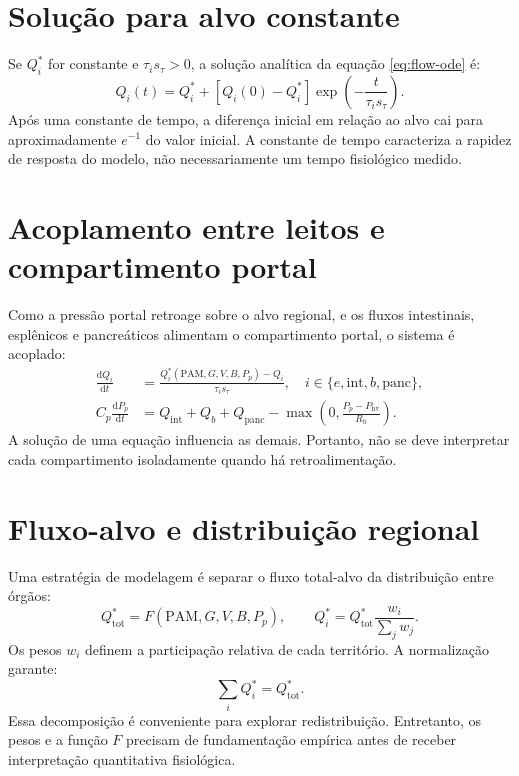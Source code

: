 \documentclass[11pt,a4paper,oneside]{book}
\newcommand{\diff}[2]{\frac{\mathrm{d}#1}{\mathrm{d}#2}}
\newcommand{\MAP}{\mathrm{PAM}}
\begin{document}
\section{Solução para alvo constante}
Se $Q_i^*$ for constante e $\tau_i s_\tau>0$, a solução analítica da equação \eqref{eq:flow-ode} é:
\begin{equation}
  Q_i(t)=Q_i^*+[Q_i(0)-Q_i^*]
  \exp\left(-\frac{t}{\tau_i s_\tau}\right).
  \label{eq:exponential}
\end{equation}
Após uma constante de tempo, a diferença inicial em relação ao alvo cai para aproximadamente $e^{-1}$ do valor inicial. A constante de tempo caracteriza a rapidez de resposta do modelo, não necessariamente um tempo fisiológico medido.

\section{Acoplamento entre leitos e compartimento portal}
Como a pressão portal retroage sobre o alvo regional, e os fluxos intestinais, esplênicos e pancreáticos alimentam o compartimento portal, o sistema é acoplado:
\begin{align}
  \diff{Q_i}{t}&=\frac{Q_i^*(\MAP,G,V,B,P_p)-Q_i}{\tau_i s_\tau},
  \quad i\in\{e,\mathrm{int},b,\mathrm{panc}\},\\
  C_p\diff{P_p}{t}&=Q_{\mathrm{int}}+Q_b+Q_{\mathrm{panc}}
  -\max\left(0,\frac{P_p-P_{\mathrm{hv}}}{R_h}\right).
\end{align}
A solução de uma equação influencia as demais. Portanto, não se deve interpretar cada compartimento isoladamente quando há retroalimentação.

\section{Fluxo-alvo e distribuição regional}
Uma estratégia de modelagem é separar o fluxo total-alvo da distribuição entre órgãos:
\begin{equation}
  Q_{\mathrm{tot}}^*=F(\MAP,G,V,B,P_p),
  \qquad
  Q_i^*=Q_{\mathrm{tot}}^*\frac{w_i}{\sum_j w_j}.
  \label{eq:target}
\end{equation}
Os pesos $w_i$ definem a participação relativa de cada território. A normalização garante:
\begin{equation}
  \sum_i Q_i^*=Q_{\mathrm{tot}}^*.
\end{equation}
Essa decomposição é conveniente para explorar redistribuição. Entretanto, os pesos e a função $F$ precisam de fundamentação empírica antes de receber interpretação quantitativa fisiológica.
\end{document}
